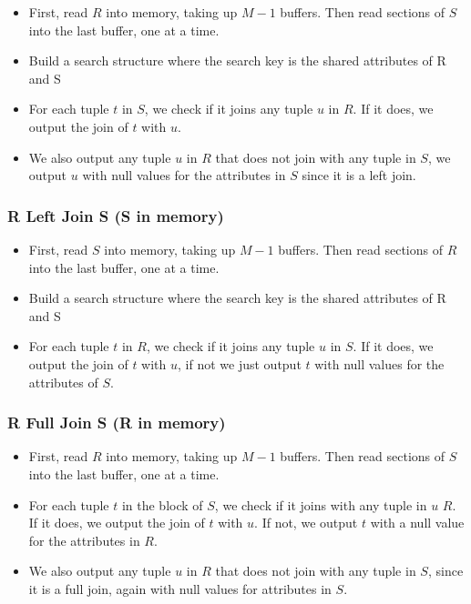\documentclass[
  letterpaper,
  DIV=11,
  numbers=noendperiod]{scrartcl}
\begin{document}
\begin{itemize}
\item
  First, read \(R\) into memory, taking up \(M-1\) buffers. Then read
  sections of \(S\) into the last buffer, one at a time.
\item
  Build a search structure where the search key is the shared attributes
  of R and S
\item
  For each tuple \(t\) in \(S\), we check if it joins any tuple \(u\) in
  \(R\). If it does, we output the join of \(t\) with \(u\).
\item
  We also output any tuple \(u\) in \(R\) that does not join with any
  tuple in \(S\), we output \(u\) with null values for the attributes in
  \(S\) since it is a left join.
\end{itemize}

\hypertarget{r-left-join-s-s-in-memory}{%
\subsubsection{R Left Join S (S in
memory)}\label{r-left-join-s-s-in-memory}}

\begin{itemize}
\item
  First, read \(S\) into memory, taking up \(M-1\) buffers. Then read
  sections of \(R\) into the last buffer, one at a time.
\item
  Build a search structure where the search key is the shared attributes
  of R and S
\item
  For each tuple \(t\) in \(R\), we check if it joins any tuple \(u\) in
  \(S\). If it does, we output the join of \(t\) with \(u\), if not we
  just output \(t\) with null values for the attributes of \(S\).
\end{itemize}

\hypertarget{r-full-join-s-r-in-memory}{%
\subsubsection{R Full Join S (R in
memory)}\label{r-full-join-s-r-in-memory}}

\begin{itemize}
\item
  First, read \(R\) into memory, taking up \(M-1\) buffers. Then read
  sections of \(S\) into the last buffer, one at a time.
\item
  For each tuple \(t\) in the block of \(S\), we check if it joins with
  any tuple in \(u\) \(R\). If it does, we output the join of \(t\) with
  \(u\). If not, we output \(t\) with a null value for the attributes in
  \(R\).
\item
  We also output any tuple \(u\) in \(R\) that does not join with any
  tuple in \(S\), since it is a full join, again with null values for
  attributes in \(S\).
\end{itemize}
\end{document}
